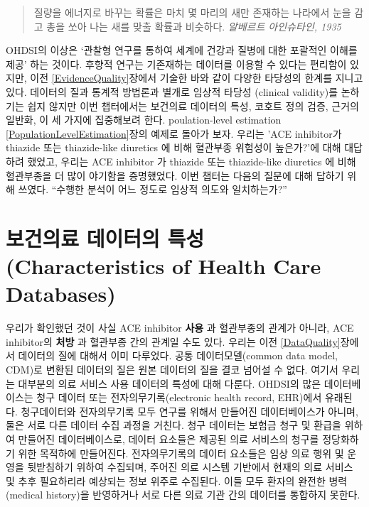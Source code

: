 \documentclass[11pt]{book}
\theoremstyle{definition}
\theoremstyle{definition}
\theoremstyle{definition}
\theoremstyle{remark}
\begin{document}
\begin{quote}
질량을 에너지로 바꾸는 확률은 마치 몇 마리의 새만 존재하는 나라에서 눈을
감고 총을 쏘아 나는 새를 맞출 확률과 비슷하다. \emph{알베르트
아인슈타인, 1935}
\end{quote}

OHDSI의 이상은 `관찰형 연구를 통하여 세계에 건강과 질병에 대한 포괄적인
이해를 제공' 하는 것이다. 후향적 연구는 기존재하는 데이터를 이용할 수
있다는 편리함이 있지만, 이전 \ref{EvidenceQuality}장에서 기술한 바와
같이 다양한 타당성의 한계를 지니고 있다. 데이터의 질과 통계적 방법론과
별개로 임상적 타당성 (clinical validity)를 논하기는 쉽지 않지만 이번
챕터에서는 보건의료 데이터의 특성, 코호트 정의 검증, 근거의 일반화, 이
세 가지에 집중해보려 한다. poulation-level estimation
\ref{PopulationLevelEstimation}장의 예제로 돌아가 보자. 우리는 'ACE
inhibitor가 thiazide 또는 thiazide-like diuretics 에 비해 혈관부종
위험성이 높은가?'에 대해 대답하려 했었고, 우리는 ACE inhibitor 가
thiazide 또는 thiazide-like diuretics 에 비해 혈관부종을 더 많이
야기함을 증명했었다. 이번 챕터는 다음의 질문에 대해 답하기 위해 쓰였다.
``수행한 분석이 어느 정도로 임상적 의도와 일치하는가?''

\section{보건의료 데이터의 특성 (Characteristics of Health Care
Databases)}\label{CharacteristicsOfDatabase}

우리가 확인했던 것이 사실 ACE inhibitor \textbf{사용} 과 혈관부종의
관계가 아니라, ACE inhibitor의 \textbf{처방} 과 혈관부종 간의 관계일
수도 있다. 우리는 이전 \ref{DataQuality}장에서 데이터의 질에 대해서 이미
다루었다. 공통 데이터모델(common data model, CDM)로 변환된 데이터의 질은
원본 데이터의 질을 결코 넘어설 수 없다. 여기서 우리는 대부분의 의료
서비스 사용 데이터의 특성에 대해 다룬다. OHDSI의 많은 데이터베이스는
청구 데이터 또는 전자의무기록(electronic health record, EHR)에서
유래된다. 청구데이터와 전자의무기록 모두 연구를 위해서 만들어진
데이터베이스가 아니며, 둘은 서로 다른 데이터 수집 과정을 거친다. 청구
데이터는 보험금 청구 및 환급을 위하여 만들어진 데이터베이스로, 데이터
요소들은 제공된 의료 서비스의 청구를 정당화하기 위한 목적하에
만들어진다. 전자의무기록의 데이터 요소들은 임상 의료 행위 및 운영을
뒷받침하기 위하여 수집되며, 주어진 의료 시스템 기반에서 현재의 의료
서비스 및 추후 필요하리라 예상되는 정보 위주로 수집된다. 이들 모두
환자의 완전한 병력(medical history)을 반영하거나 서로 다른 의료 기관
간의 데이터를 통합하지 못한다.
\end{document}
